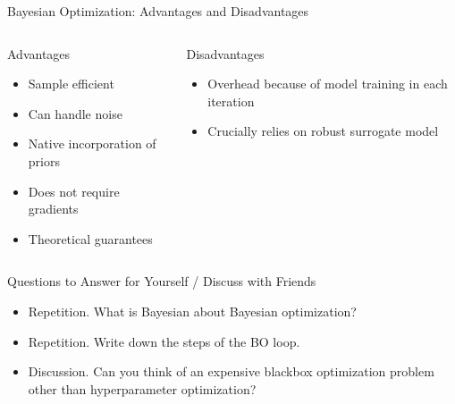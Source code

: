 \begin{frame}[c]{Bayesian Optimization: Advantages and Disadvantages}

\begin{columns}[T] %
\begin{column}{.48\textwidth}


\begin{block}{Advantages}
\begin{itemize}
  \item Sample efficient 
  \item Can handle noise
  \item Native incorporation of priors 
  \item Does not require gradients 
  \item Theoretical guarantees
\end{itemize}
\end{block}

\end{column}%

\hfill%
\fhpause 
\begin{column}{.48\textwidth}

\begin{block}{Disadvantages}
\begin{itemize}
  \item Overhead because of model training in each iteration 
  \item Crucially relies on robust surrogate model
\end{itemize}
\end{block}

\end{column}
\end{columns}

\end{frame}

\begin{frame}[c]{Questions to Answer for Yourself / Discuss with Friends}

\begin{itemize}
    \item \alert{Repetition.} What is Bayesian about Bayesian optimization?
\medskip
    \item \alert{Repetition.} Write down the steps of the BO loop.
\medskip
    \item \alert{Discussion.} Can you think of an expensive blackbox optimization problem other than hyperparameter optimization?
\end{itemize}

\end{frame}

